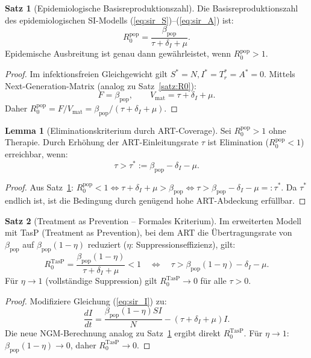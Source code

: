 ﻿\documentclass[a4paper,12pt]{article}
\theoremstyle{definition}
\newtheorem{satz}{Satz}
\newtheorem{lemma}{Lemma}
\begin{document}
\begin{satz}[Epidemiologische Basisreproduktionszahl]
\label{satz:R0_pop}
Die Basisreproduktionszahl des epidemiologischen SI-Modells (\ref{eq:sir_S})--(\ref{eq:sir_A}) ist:
\[
R_0^{\text{pop}} = \frac{\beta_{\text{pop}}}{\tau + \delta_I + \mu}.
\]
Epidemische Ausbreitung ist genau dann gew\"ahrleistet, wenn $R_0^{\text{pop}} > 1$.
\end{satz}

\begin{proof}
Im infektionsfreien Gleichgewicht gilt $S^* = N, I^* = T_r^* = A^* = 0$.
Mittels Next-Generation-Matrix (analog zu Satz~\ref{satz:R0}):
\[
F = \beta_{\text{pop}}, \qquad V_{\text{mat}} = \tau + \delta_I + \mu.
\]
Daher $R_0^{\text{pop}} = F / V_{\text{mat}} = \beta_{\text{pop}} / (\tau + \delta_I + \mu)$.
\end{proof}

\begin{lemma}[Eliminationskriterium durch ART-Coverage]
\label{lem:elimination}
Sei $R_0^{\text{pop}} > 1$ ohne Therapie. Durch Erh\"ohung der ART-Einleitungsrate $\tau$
ist Elimination ($R_0^{\text{pop}} < 1$) erreichbar, wenn:
\[
\tau > \tau^* := \beta_{\text{pop}} - \delta_I - \mu.
\]
\end{lemma}

\begin{proof}
Aus Satz~\ref{satz:R0_pop}: $R_0^{\text{pop}} < 1 \Leftrightarrow \tau + \delta_I + \mu > \beta_{\text{pop}}
\Leftrightarrow \tau > \beta_{\text{pop}} - \delta_I - \mu =: \tau^*$. Da $\tau^*$ endlich ist,
ist die Bedingung durch gen\"ugend hohe ART-Abdeckung erf\"ullbar.
\end{proof}

\begin{satz}[Treatment as Prevention -- Formales Kriterium]
\label{satz:tasp}
Im erweiterten Modell mit TasP (Treatment as Prevention), bei dem ART die
\"Ubertragungsrate von $\beta_{\text{pop}}$ auf $\beta_{\text{pop}} (1 - \eta)$ reduziert
($\eta$: Suppressionseffizienz), gilt:
\[
R_0^{\text{TasP}} = \frac{\beta_{\text{pop}}(1-\eta)}{\tau + \delta_I + \mu} < 1
\quad\Leftrightarrow\quad
\tau > \beta_{\text{pop}}(1-\eta) - \delta_I - \mu.
\]
F\"ur $\eta \to 1$ (vollst\"andige Suppression) gilt $R_0^{\text{TasP}} \to 0$ f\"ur
alle $\tau > 0$.
\end{satz}

\begin{proof}
Modifiziere Gleichung (\ref{eq:sir_I}) zu:
\[
\frac{dI}{dt} = \frac{\beta_{\text{pop}}(1-\eta) S I}{N} - (\tau + \delta_I + \mu) I.
\]
Die neue NGM-Berechnung analog zu Satz~\ref{satz:R0_pop} ergibt direkt $R_0^{\text{TasP}}$.
F\"ur $\eta \to 1$: $\beta_{\text{pop}}(1-\eta) \to 0$, daher $R_0^{\text{TasP}} \to 0$.
\end{proof}
\end{document}
